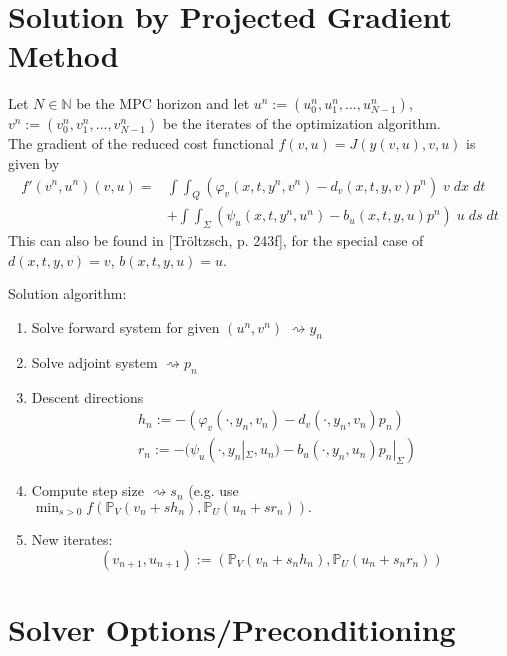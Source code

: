 \documentclass[
12pt, %
a4paper, %
onecolumn, %
portrait %
]{article}
\begin{document}
\section{Solution by Projected Gradient Method}
Let $N \in \mathbb{N}$ be the MPC horizon and let $u^n := (u_0^n, u_1^n, \hdots, u_{N-1}^n)$, $v^n := (v_0^n, v_1^n, \hdots, v_{N-1}^n)$ be the iterates of the optimization algorithm. \\ 
The gradient of the reduced cost functional $f(v,u) = J(y(v,u), v, u)$ is given by
\begin{align*}
f'(v^n, u^n)(v,u) = & \int \int_Q (\varphi_v(x,t, y^n, v^n) - d_v(x,t,y,v) p^n) \; v \; dx \; dt \\
& + \int \int_{\Sigma} (\psi_u(x,t,y^n, u^n) - b_u(x,t,y,u) p^n) \; u \; ds \; dt
\end{align*}
This can also be found in [Tr\"oltzsch, p. 243f], for the special case of $d(x,t,y,v) = v$, $b(x,t,y,u) = u$.

Solution algorithm:\\
\begin{enumerate}
\item Solve forward system for given $(u^n, v^n)$ $\rightsquigarrow y_n$ \\
\item Solve adjoint system $\rightsquigarrow p_n$ \\
\item Descent directions
\begin{align*}
&h_n := -(\varphi_v(\cdot, y_n, v_n) - d_v(\cdot,y_n,v_n) p_n) \\ 
&r_n := -(\psi_u(\cdot, y_n |_{\Sigma}, u_n) - b_u(\cdot,y_n,u_n) p_n |_{\Sigma})
\end{align*}
\item Compute step size $\rightsquigarrow s_n$
(e.g. use $\min_{s > 0} f(\mathbb{P}_V(v_n+s h_n), \mathbb{P}_U(u_n + s r_n)).$
\item New iterates:
\begin{equation}
(v_{n+1}, u_{n+1}) := (\mathbb{P}_V(v_n + s_n h_n), \mathbb{P}_U(u_n + s_n r_n))
\end{equation}
\end{enumerate}

\section{Solver Options/Preconditioning}
\newpage

\renewcommand{\refname}{Reference} %




\end{document}
